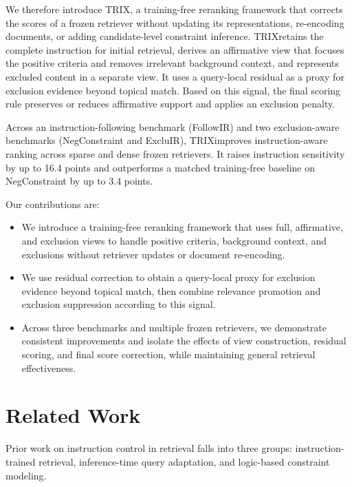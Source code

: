 \documentclass[letterpaper]{article}
\newcommand{\method}{\ifmmode \mathrm{TRIX}\else TRIX\xspace\fi}
\begin{document}
We therefore introduce \method, a training-free reranking framework that
corrects the scores of a frozen retriever without updating its representations,
re-encoding documents, or adding candidate-level constraint inference.
\method retains the complete instruction for initial retrieval, derives an
affirmative view that focuses the positive criteria and removes irrelevant
background context, and represents excluded content in a separate view.  It
uses a query-local residual as a proxy for exclusion evidence beyond topical
match.  Based on this signal, the final scoring rule preserves or reduces
affirmative support and applies an exclusion penalty.

Across an instruction-following benchmark (FollowIR) and two exclusion-aware
benchmarks (NegConstraint and ExcluIR), \method improves instruction-aware
ranking across sparse and dense frozen retrievers.  It raises instruction
sensitivity by up to 16.4 points and outperforms a matched training-free
baseline on NegConstraint by up to 3.4 points.

Our contributions are:
\begin{itemize}
    \item[$\bullet$] We introduce a training-free reranking framework that uses full,
    affirmative, and exclusion views to handle positive criteria, background
    context, and exclusions without retriever updates or document re-encoding.
    \item[$\bullet$] We use residual correction to obtain a query-local proxy
    for exclusion evidence beyond topical match, then combine relevance
    promotion and exclusion suppression according to this signal.
    \item[$\bullet$] Across three benchmarks and multiple frozen retrievers, we
    demonstrate consistent improvements and isolate the effects of view
    construction, residual scoring, and final score correction, while
    maintaining general retrieval effectiveness.
\end{itemize}

\section{Related Work}
\label{sec:related-work}

Prior work on instruction control in retrieval falls into three groups:
instruction-trained retrieval, inference-time query adaptation, and logic-based
constraint modeling.
\end{document}
